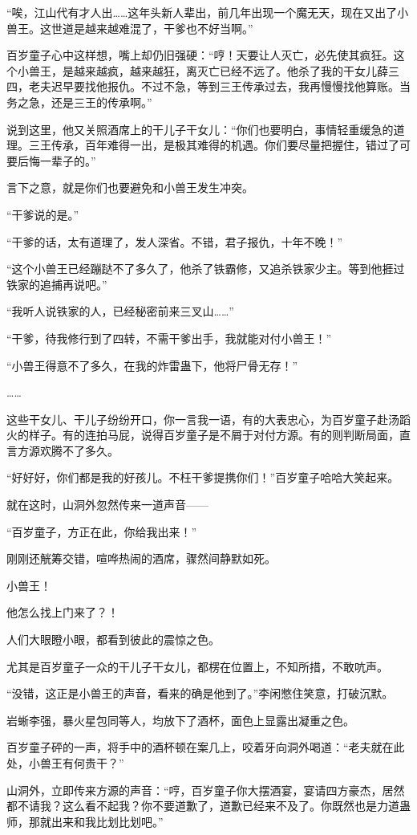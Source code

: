 \begin{this_body}
“唉，江山代有才人出……这年头新人辈出，前几年出现一个魔无天，现在又出了小兽王。这世道是越来越难混了，干爹也不好当啊。”

百岁童子心中这样想，嘴上却仍旧强硬：“哼！天要让人灭亡，必先使其疯狂。这个小兽王，是越来越疯，越来越狂，离灭亡已经不远了。他杀了我的干女儿薛三四，老夫迟早要找他报仇。不过不急，等到三王传承过去，我再慢慢找他算账。当务之急，还是三王的传承啊。”

说到这里，他又关照酒席上的干儿子干女儿：“你们也要明白，事情轻重缓急的道理。三王传承，百年难得一出，是极其难得的机遇。你们要尽量把握住，错过了可要后悔一辈子的。”

言下之意，就是你们也要避免和小兽王发生冲突。

“干爹说的是。”

“干爹的话，太有道理了，发人深省。不错，君子报仇，十年不晚！”

“这个小兽王已经蹦跶不了多久了，他杀了铁霸修，又追杀铁家少主。等到他捱过铁家的追捕再说吧。”

“我听人说铁家的人，已经秘密前来三叉山……”

“干爹，待我修行到了四转，不需干爹出手，我就能对付小兽王！”

“小兽王得意不了多久，在我的炸雷蛊下，他将尸骨无存！”

……

这些干女儿、干儿子纷纷开口，你一言我一语，有的大表忠心，为百岁童子赴汤蹈火的样子。有的连拍马屁，说得百岁童子是不屑于对付方源。有的则判断局面，直言方源欢腾不了多久。

“好好好，你们都是我的好孩儿。不枉干爹提携你们！”百岁童子哈哈大笑起来。

就在这时，山洞外忽然传来一道声音——

“百岁童子，方正在此，你给我出来！”

刚刚还觥筹交错，喧哗热闹的酒席，骤然间静默如死。

小兽王！

他怎么找上门来了？！

人们大眼瞪小眼，都看到彼此的震惊之色。

尤其是百岁童子一众的干儿子干女儿，都楞在位置上，不知所措，不敢吭声。

“没错，这正是小兽王的声音，看来的确是他到了。”李闲憋住笑意，打破沉默。

岩蜥李强，暴火星包同等人，均放下了酒杯，面色上显露出凝重之色。

百岁童子砰的一声，将手中的酒杯顿在案几上，咬着牙向洞外喝道：“老夫就在此处，小兽王有何贵干？”

山洞外，立即传来方源的声音：“哼，百岁童子你大摆酒宴，宴请四方豪杰，居然都不请我？这么看不起我？你不要道歉了，道歉已经来不及了。你既然也是力道蛊师，那就出来和我比划比划吧。”


\end{this_body}
